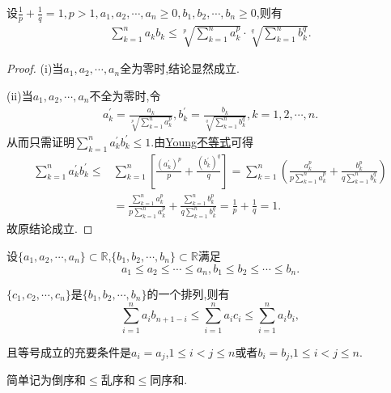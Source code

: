 \documentclass[../../main.tex]{subfiles}
\begin{document}
\begin{theorem}[Hold不等式]\label{theorem:Hold不等式}
设$\frac{1}{p}+\frac{1}{q}=1,p>1,a_1,a_2,\cdots,a_n\geqslant 0,b_1,b_2,\cdots,b_n\geqslant 0$,则有
\begin{align*}
\sum\limits_{k=1}^n{a_kb_k}\le \sqrt[p]{\sum\limits_{k=1}^n{a_{k}^{p}}}\cdot \sqrt[q]{\sum\limits_{k=1}^n{b_{k}^{q}}}.
\end{align*}
\end{theorem}
\begin{proof}
(i)当$a_1,a_2,\cdots,a_n$全为零时,结论显然成立.

(ii)当$a_1,a_2,\cdots,a_n$不全为零时,令
\begin{align*}
a_{k}^{\prime}=\frac{a_k}{\sqrt[p]{\sum\limits_{k=1}^n{a_{k}^{p}}}},b_{k}^{\prime}=\frac{b_k}{\sqrt[q]{\sum\limits_{k=1}^n{b_{k}^{q}}}},k=1,2,\cdots,n.
\end{align*}
从而只需证明$\sum\limits_{k=1}^n{a_{k}^{\prime}b_{k}^{\prime}}\leqslant 1$.由\hyperref[theorem:Young不等式]{Young不等式}可得
\begin{align*}
\sum\limits_{k=1}^n{a_{k}^{\prime}b_{k}^{\prime}}\leqslant &\sum\limits_{k=1}^n{\left[ \frac{\left( a_{k}^{\prime} \right) ^p}{p}+\frac{\left( b_{k}^{\prime} \right) ^q}{q} \right]}=\sum\limits_{k=1}^n{\left( \frac{a_{k}^{p}}{p\sum\limits_{k=1}^n{a_{k}^{p}}}+\frac{b_{k}^{p}}{q\sum\limits_{k=1}^n{b_{k}^{q}}} \right)}
\\
&=\frac{\sum\limits_{k=1}^n{a_{k}^{p}}}{p\sum\limits_{k=1}^n{a_{k}^{p}}}+\frac{\sum\limits_{k=1}^n{b_{k}^{p}}}{q\sum\limits_{k=1}^n{b_{k}^{q}}}=\frac{1}{p}+\frac{1}{q}=1.
\end{align*}
故原结论成立.

\end{proof}

\begin{theorem}[排序和不等式]\label{theorem:排序和不等式}
设\(\{a_1,a_2,\cdots,a_n\} \subset \mathbb{R}\),\(\{b_1,b_2,\cdots,b_n\} \subset \mathbb{R}\)满足
\[
a_1 \leqslant  a_2 \leqslant  \cdots \leqslant  a_n, b_1 \leqslant  b_2 \leqslant  \cdots \leqslant  b_n.
\]

\(\{c_1,c_2,\cdots,c_n\}\)是\(\{b_1,b_2,\cdots,b_n\}\)的一个排列,则有
\[
\sum\limits_{i = 1}^{n} a_i b_{n + 1 - i} \leqslant  \sum\limits_{i = 1}^{n} a_i c_i \leqslant  \sum\limits_{i = 1}^{n} a_i b_i,
\]

且等号成立的充要条件是\(a_i = a_j\),\(1 \leqslant  i < j \leqslant  n\)或者\(b_i = b_j\),\(1 \leqslant  i < j \leqslant  n\).
\end{theorem}
\begin{note}
简单记为倒序和\(\leqslant \)乱序和\(\leqslant \)同序和.
\end{note}
\end{document}
